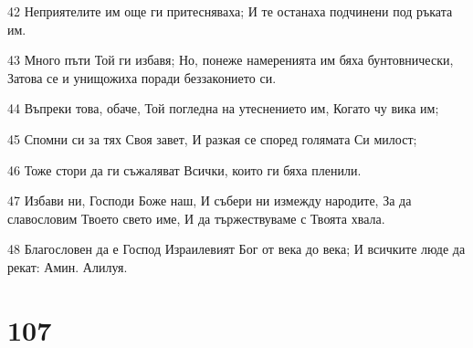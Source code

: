 \par 42 Неприятелите им още ги притесняваха; И те останаха подчинени под ръката им.
\par 43 Много пъти Той ги избавя; Но, понеже намеренията им бяха бунтовнически, Затова се и унищожиха поради беззаконието си.
\par 44 Въпреки това, обаче, Той погледна на утеснението им, Когато чу вика им;
\par 45 Спомни си за тях Своя завет, И разкая се според голямата Си милост;
\par 46 Тоже стори да ги съжаляват Всички, които ги бяха пленили.
\par 47 Избави ни, Господи Боже наш, И събери ни измежду народите, За да славословим Твоето свето име, И да тържествуваме с Твоята хвала.
\par 48 Благословен да е Господ Израилевият Бог от века до века; И всичките люде да рекат: Амин. Алилуя.

\chapter{107}

